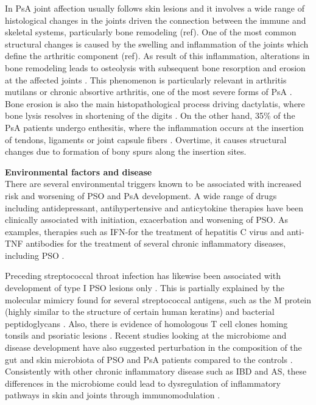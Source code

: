 In PsA joint affection usually follows skin lesions and it involves a wide range of histological changes in the joints driven the connection between the immune and skeletal systems, particularly bone remodeling (ref). One of the most common structural changes is caused by the swelling and inflammation of the joints which define the arthritic component (ref). As result of this inflammation, alterations in bone remodeling leads to osteolysis with subsequent bone resorption and erosion at the affected joints \parencite{Mensah2017}. This phenomenon is particularly relevant in arthritis mutilans or chronic absortive arthritis, one of the most severe forms of PsA \parencite{Haddad2013}. Bone erosion is also the main histopathological process driving dactylatis, where bone lysis resolves in shortening of the digits \parencite{Gladman2005}. On the other hand, 35\% of the PsA patients undergo enthesitis, where the inflammation occurs at the insertion of tendons, ligaments or joint capsule fibers \parencite{Polachek2017}. Overtime, it causes structural changes due to formation of bony spurs along the insertion sites\parencite{Schett2011}.


\textbf{Environmental factors and disease}\\

There are several environmental triggers known to be associated with increased risk and worsening of PSO and PsA development. A wide range of drugs including antidepressant, antihypertensive and anticytokine therapies have been clinically associated with initiation, exacerbation and worsening of PSO. As examples, therapies such as IFN-\alpha for the treatment of hepatitis C virus and anti-TNF antibodies for the treatment of several chronic inflammatory diseases, including PSO \parencite{Kim2010}.

Preceding streptococcal throat infection has likewise been associated with development of type I PSO lesions only \parencite{Gudjonsson2003}. This is partially explained by the molecular mimicry found for several streptococcal antigens, such as the M protein (highly similar to the structure of certain human keratins) and bacterial peptidoglycans \parencite{Valdimarsson2009}. Also, there is evidence of homologous T cell clones homing tonsils and psoriatic lesions \parencite{Diluvio2006}. Recent studies looking at the microbiome and disease development have also suggested perturbation in the composition of the gut and skin microbiota of PSO and PsA patients compared to the controls \parencite{Yan2017}. Consistently with other chronic inflammatory disease such as IBD and AS, these differences in the microbiome could lead to dysregulation of inflammatory pathways in skin and joints through immunomodulation \parencite{Eppinga2014}.

